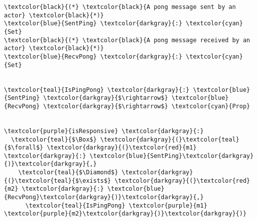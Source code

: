 \begin{Verbatim}[commandchars=\\\{\},codes={\catcode`$=3}]
\textcolor{black}{(*} \textcolor{black}{A pong message sent by an actor} \textcolor{black}{*)}
\textcolor{blue}{SentPing} \textcolor{darkgray}{:} \textcolor{cyan}{Set}
\textcolor{black}{(*} \textcolor{black}{A pong message received by an actor} \textcolor{black}{*)}
\textcolor{blue}{RecvPong} \textcolor{darkgray}{:} \textcolor{cyan}{Set}


\textcolor{teal}{IsPingPong} \textcolor{darkgray}{:} \textcolor{blue}{SentPing} \textcolor{darkgray}{$\rightarrow$} \textcolor{blue}{RecvPong} \textcolor{darkgray}{$\rightarrow$} \textcolor{cyan}{Prop}


\textcolor{purple}{isResponsive} \textcolor{darkgray}{:} 
  \textcolor{teal}{$\Box$} \textcolor{darkgray}{(}\textcolor{teal}{$\forall$} \textcolor{darkgray}{(}\textcolor{red}{m1} \textcolor{darkgray}{:} \textcolor{blue}{SentPing}\textcolor{darkgray}{)}\textcolor{darkgray}{,} 
    \textcolor{teal}{$\Diamond$} \textcolor{darkgray}{(}\textcolor{teal}{$\exists$} \textcolor{darkgray}{(}\textcolor{red}{m2} \textcolor{darkgray}{:} \textcolor{blue}{RecvPong}\textcolor{darkgray}{)}\textcolor{darkgray}{,} 
      \textcolor{teal}{IsPingPong} \textcolor{purple}{m1} \textcolor{purple}{m2}\textcolor{darkgray}{)}\textcolor{darkgray}{)}
\end{Verbatim}
